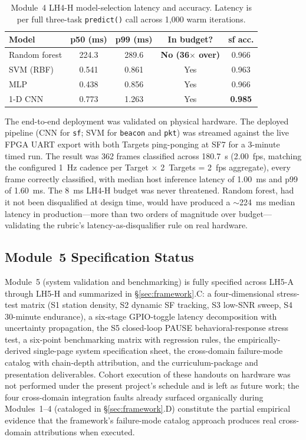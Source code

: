\documentclass[conference]{IEEEtran}
\begin{document}
\begin{table}[t]
\centering
\caption{Module~4 LH4-H model-selection latency and accuracy. Latency is per full three-task \texttt{predict()} call across 1{,}000 warm iterations.}
\label{tab:m4latency}
\begin{tabular}{l c c c c}
\toprule
\textbf{Model} & \textbf{p50 (ms)} & \textbf{p99 (ms)} & \textbf{In budget?} & \textbf{sf acc.} \\
\midrule
Random forest & 224.3 & 289.6 & \textbf{No (36$\times$ over)} & 0.966 \\
SVM (RBF) & 0.541 & 0.861 & Yes & 0.963 \\
MLP & 0.438 & 0.856 & Yes & 0.966 \\
1-D CNN & 0.773 & 1.263 & Yes & \textbf{0.985} \\
\bottomrule
\end{tabular}
\end{table}

The end-to-end deployment was validated on physical hardware. The deployed pipeline (CNN for \texttt{sf}; SVM for \texttt{beacon} and \texttt{pkt}) was streamed against the live FPGA UART export with both Targets ping-ponging at SF7 for a 3-minute timed run. The result was 362 frames classified across 180.7~s (2.00~fps, matching the configured 1~Hz cadence per Target $\times$ 2~Targets = 2~fps aggregate), every frame correctly classified, with median host inference latency of 1.00~ms and p99 of 1.60~ms. The 8~ms LH4-H budget was never threatened. Random forest, had it not been disqualified at design time, would have produced a $\sim$224~ms median latency in production---more than two orders of magnitude over budget---validating the rubric's latency-as-disqualifier rule on real hardware.

\subsection{Module~5 Specification Status}\label{sec:m5status}

Module~5 (system validation and benchmarking) is fully specified across LH5-A through LH5-H and summarized in \S\ref{sec:framework}.C: a four-dimensional stress-test matrix (S1 station density, S2 dynamic SF tracking, S3 low-SNR sweep, S4 30-minute endurance), a six-stage GPIO-toggle latency decomposition with uncertainty propagation, the S5 closed-loop PAUSE behavioral-response stress test, a six-point benchmarking matrix with regression rules, the empirically-derived single-page system specification sheet, the cross-domain failure-mode catalog with chain-depth attribution, and the curriculum-package and presentation deliverables. Cohort execution of these handouts on hardware was not performed under the present project's schedule and is left as future work; the four cross-domain integration faults already surfaced organically during Modules~1--4 (cataloged in \S\ref{sec:framework}.D) constitute the partial empirical evidence that the framework's failure-mode catalog approach produces real cross-domain attributions when executed.
\end{document}
